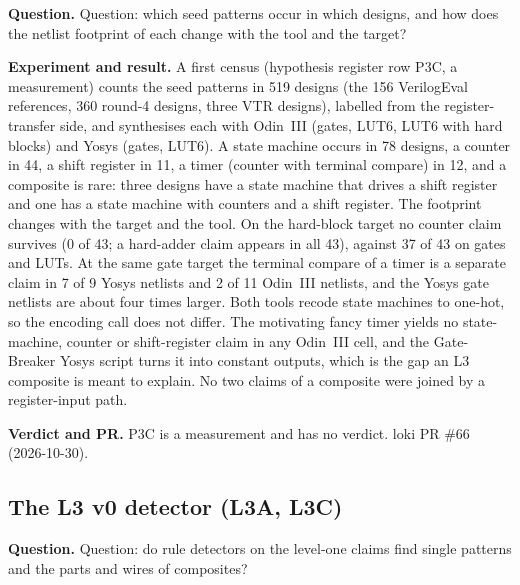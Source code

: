 \documentclass[conference]{IEEEtran}
\newcommand{\hev}[1]{\par\smallskip\noindent\textbf{#1}}
\begin{document}
\hev{Question.} Question: which seed patterns occur in which designs, and how does the netlist footprint of each change with the tool and the target?

\hev{Experiment and result.} A first census (hypothesis register row P3C, a measurement) counts the seed patterns in 519 designs (the 156 VerilogEval
references, 360 round-4 designs, three VTR designs), labelled from the register-transfer side, and synthesises each with
Odin~III (gates, LUT6, LUT6 with hard blocks) and Yosys (gates, LUT6). A state machine occurs in 78 designs, a counter in
44, a shift register in 11, a timer (counter with terminal compare) in 12, and a composite is rare: three designs have a
state machine that drives a shift register and one has a state machine with counters and a shift register. The footprint
changes with the target and the tool. On the hard-block target no counter claim survives (0 of 43; a hard-adder claim
appears in all 43), against 37 of 43 on gates and LUTs. At the same gate target the terminal compare of a timer is a separate
claim in 7 of 9 Yosys netlists and 2 of 11 Odin~III netlists, and the Yosys gate netlists are about four times larger. Both tools recode
state machines to one-hot, so the encoding call does not differ. The motivating fancy timer yields no state-machine,
counter or shift-register claim in any Odin~III cell, and the Gate-Breaker Yosys script turns it into constant outputs,
which is the gap an L3 composite is meant to explain. No two claims of a composite were joined by a register-input path.

\hev{Verdict and PR.} P3C is a measurement and has no verdict. loki PR \#66 (2026-10-30).

\subsection{The L3 v0 detector (L3A, L3C)}
\label{rec:detector}

\hev{Question.} Question: do rule detectors on the level-one claims find single patterns and the parts and wires of composites?
\end{document}
